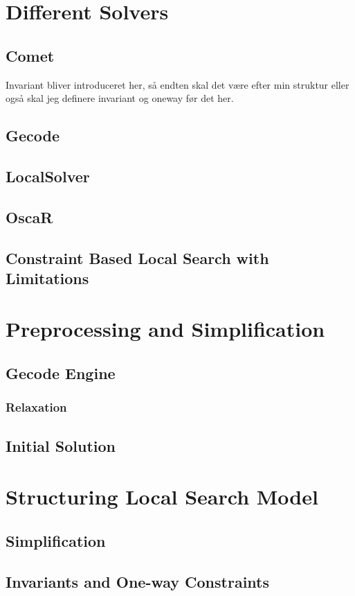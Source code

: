 \documentclass[a4paper,10pt]{article}
\begin{document}
\section{Different Solvers }
  \subsection{Comet}
  Invariant bliver introduceret her, så endten skal det være efter min struktur eller også skal jeg definere invariant 
  og oneway før det her. 
  \subsection{Gecode}
  \subsection{LocalSolver}
  \subsection{OscaR}
  \subsection{ Constraint Based Local Search with Limitations} %
\section{Preprocessing and Simplification}
  \subsection{Gecode Engine}
    \subsubsection{Relaxation}
  \subsection{Initial Solution}
\section{Structuring Local Search Model}
  \subsection{Simplification}
  \subsection{Invariants and One-way Constraints}
    
\end{document}
